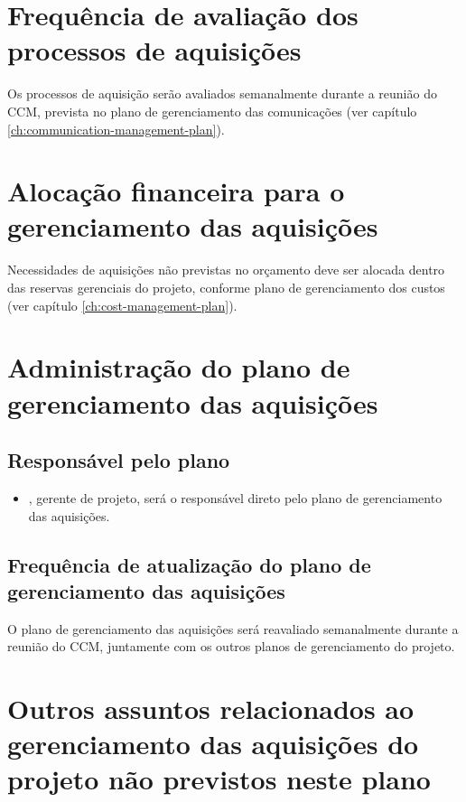 \section{Frequência de avaliação dos processos de aquisições}

Os processos de aquisição serão avaliados semanalmente durante a reunião do CCM, prevista no plano de gerenciamento das comunicações (ver capítulo \ref{ch:communication-management-plan}).

\section{Alocação financeira para o gerenciamento das aquisições}

Necessidades de aquisições não previstas no orçamento deve ser alocada dentro das reservas gerenciais do projeto, conforme plano de gerenciamento dos custos (ver capítulo \ref{ch:cost-management-plan}).

\section{Administração do plano de gerenciamento das aquisições}

\subsection{Responsável pelo plano}

\begin{itemize}
	\item \projectManagerName{}, gerente de projeto, será o responsável direto pelo plano de gerenciamento das aquisições.
\end{itemize}

\subsection{Frequência de atualização do plano de gerenciamento das aquisições}

O plano de gerenciamento das aquisições será reavaliado semanalmente durante a reunião do CCM, juntamente com os outros planos de gerenciamento do projeto.

\section{Outros assuntos relacionados ao gerenciamento das aquisições do projeto não previstos neste plano}

